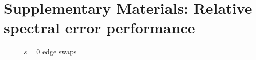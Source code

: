\documentclass[12pt]{article}
\theoremstyle{plain}
\begin{document}
\clearpage
\section{Supplementary Materials: Relative spectral error performance}
\label{S:spectral-peformance}


\begin{figure}[h]
  \centering
  \vspace{-1em}
  \caption{$s = 0$ edge swaps}
\end{figure}
\end{document}
